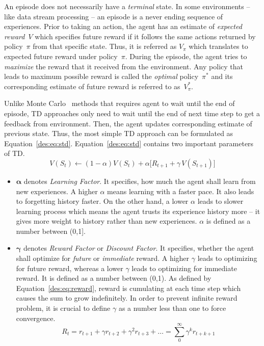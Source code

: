 An episode does not necessarily have a \emph{terminal} state. In some environments -- like data stream processing -- an episode is a never ending sequence of experiences. Prior to taking an action, the agent has an estimate of \emph{expected reward}~$V$ which specifies future reward if it follows the same actions returned by policy~$\pi$ from that specific state. Thus, it is referred as $V_\pi$ which translates to expected future reward under policy~$\pi$. During the episode, the agent tries to \emph{maximize} the reward that it received from the environment. Any policy that leads to maximum possible reward is called the \emph{optimal} policy~$\pi^*$ and its corresponding estimate of future reward is referred to as~$V^{*}_{\pi}$.

Unlike Monte Carlo~\cite{rlIntro} methods that requires agent to wait until the end of episode, TD approaches only need to wait until the end of next time step to get a feedback from environment. Then, the agent updates corresponding estimate of previous state. Thus, the most simple TD approach can be formulated as Equation~\ref{des:eq:std}. Equation~\ref{des:eq:std} contains two important parameters of TD.
\begin{equation}
V(S_t) \longleftarrow (1-\alpha)V(S_t) + \alpha\big[R_{t+1} + \gamma\,V(S_{t+1})\big]
\label{des:eq:std}
\end{equation}
\begin{itemize}
	\item $\bm{\alpha}$ denotes \emph{Learning Factor}. It specifies, how much the agent shall learn from new experiences. A higher $\alpha$ means learning with a faster pace. It also leads to forgetting history faster. On the other hand, a lower $\alpha$ leads to slower learning process which means the agent trusts its experience history more -- it gives more weight to history rather than new experiences. $\alpha$ is defined as a number between (0,1].
	\item $\bm{\gamma}$ denotes \emph{Reward Factor} or \emph{Discount Factor}. It specifies, whether the agent shall optimize for \emph{future} or \emph{immediate} reward. A higher $\gamma$ leads to optimizing for future reward, whereas a lower $\gamma$ leads to optimizing for immediate reward. It is defined as a number between (0,1). As defined by Equation~\ref{des:eq:reward}, reward is cumulating at each time step which causes the sum to grow indefinitely. In order to prevent infinite reward problem, it is crucial to define $\gamma$ as a number less than one to force convergence.
	\begin{equation}
	R_t = r_{t+1}+\gamma r_{t+2}+\gamma^2 r_{t+3}+\dots=\sum_{0}^{\infty}\gamma^k r_{t+k+1}
	\label{des:eq:reward}
	\end{equation}
\end{itemize}

